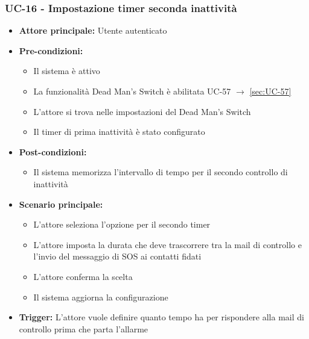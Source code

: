 \documentclass[a4paper,12pt]{article}
\begin{document}
\subsubsection{UC-16 - Impostazione timer seconda inattività} \label{sec:UC-16}
\begin{itemize}
    \item \textbf{Attore principale:} Utente autenticato
    \item \textbf{Pre-condizioni:}
    \begin{itemize}
        \item Il sistema è attivo
        \item La funzionalità Dead Man's Switch è abilitata UC-57 $\rightarrow$ \ref{sec:UC-57}
        \item L'attore si trova nelle impostazioni del Dead Man's Switch
        \item Il timer di prima inattività è stato configurato
    \end{itemize}
    \item \textbf{Post-condizioni:}
    \begin{itemize}
        \item Il sistema memorizza l'intervallo di tempo per il secondo controllo di inattività
    \end{itemize}
    \item \textbf{Scenario principale:}
    \begin{itemize}
        \item L'attore seleziona l'opzione per il secondo timer
        \item L'attore imposta la durata che deve trascorrere tra la mail di controllo e l'invio del messaggio di SOS ai contatti fidati
        \item L'attore conferma la scelta
        \item Il sistema aggiorna la configurazione
    \end{itemize}
    \item \textbf{Trigger:} L'attore vuole definire quanto tempo ha per rispondere alla mail di controllo prima che parta l'allarme
\end{itemize}
\end{document}

